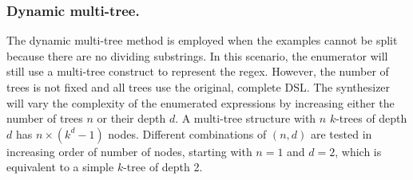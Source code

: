\subsubsection{Dynamic multi-tree.}\label{sec:dynamic-multi-tree} The dynamic multi-tree method is employed when the examples cannot be split because there are no dividing substrings.
In this scenario, the enumerator will still use a multi-tree construct to represent the regex. However, the number of trees is not fixed and all trees use the original, complete DSL. 
The synthesizer will vary the complexity of the enumerated expressions by increasing either the number of trees \(n\) or their depth \(d\).
A multi-tree structure with \(n\) \(k\)-trees of depth \(d\) has \(n \times (k^d - 1)\) nodes.
Different combinations of \((n, d)\) are tested in increasing order of number of nodes, starting with \(n = 1\) and \(d = 2\), which is equivalent to a simple \(k\)-tree of depth 2.

